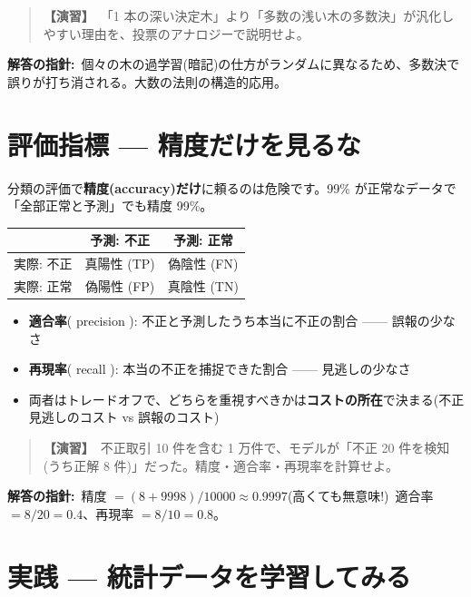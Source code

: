 \documentclass{article}
\begin{document}
\begin{quote}
\textbf{【演習】}\ 「1 本の深い決定木」より「多数の浅い木の多数決」が汎化しやすい理由を、投票のアナロジーで説明せよ。
\end{quote}

\textbf{解答の指針:}\ 個々の木の過学習(暗記)の仕方がランダムに異なるため、多数決で誤りが打ち消される。大数の法則の構造的応用。

\section{評価指標 — 精度だけを見るな}

分類の評価で\textbf{精度(accuracy)だけ}に頼るのは危険です。99\% が正常なデータで「全部正常と予測」でも精度 99\%。

\begin{center}
\begin{tabular}{|l|c|c|}
\hline
 & 予測: 不正 & 予測: 正常 \\
\hline
実際: 不正 & 真陽性 (TP) & 偽陰性 (FN) \\
実際: 正常 & 偽陽性 (FP) & 真陰性 (TN) \\
\hline
\end{tabular}
\end{center}

\begin{itemize}
\item \textbf{適合率}( precision ): 不正と予測したうち本当に不正の割合 —— 誤報の少なさ
\item \textbf{再現率}( recall ): 本当の不正を捕捉できた割合 —— 見逃しの少なさ
\item 両者はトレードオフで、どちらを重視すべきかは\textbf{コストの所在}で決まる(不正見逃しのコスト vs 誤報のコスト)
\end{itemize}

\begin{quote}
\textbf{【演習】}\ 不正取引 10 件を含む 1 万件で、モデルが「不正 20 件を検知(うち正解 8 件)」だった。精度・適合率・再現率を計算せよ。
\end{quote}

\textbf{解答の指針:}\ 精度 \(= (8 + 9998)/10000 \approx 0.9997\)(高くても無意味!)\ 適合率 \(= 8/20 = 0.4\)、再現率 \(= 8/10 = 0.8\)。

\section{実践 — 統計データを学習してみる}
\end{document}
